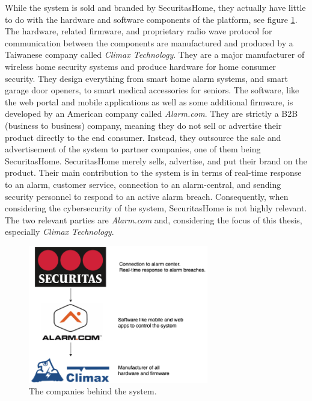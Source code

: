 While the system is sold and branded by SecuritasHome, they actually have little to do with the hardware and software components of the platform, see figure \ref{fig:company-structure}. The hardware, related firmware, and proprietary radio wave protocol for communication between the components are manufactured and produced by a Taiwanese company called \textit{Climax Technology}. They are a major manufacturer of wireless home security systems and produce hardware for home consumer security. They design everything from smart home alarm systems, and smart garage door openers, to smart medical accessories for seniors. The software, like the web portal and mobile applications as well as some additional firmware, is developed by an American company called \textit{Alarm.com}. They are strictly a B2B (business to business) company, meaning they do not sell or advertise their product directly to the end consumer. Instead, they outsource the sale and advertisement of the system to partner companies, one of them being SecuritasHome. SecuritasHome merely sells, advertise, and put their brand on the product. Their main contribution to the system is in terms of real-time response to an alarm, customer service, connection to an alarm-central, and sending security personnel to respond to an active alarm breach. Consequently, when considering the cybersecurity of the system, SecuritasHome is not highly relevant. The two relevant parties are \textit{Alarm.com} and, considering the focus of this thesis, especially \textit{Climax Technology}.
\begin{figure}[!ht]
    \centering
    \includegraphics[width=0.7\textwidth]{images/3-system/company-structure.png}
    \caption{The companies behind the system.}
    \label{fig:company-structure}
\end{figure}

